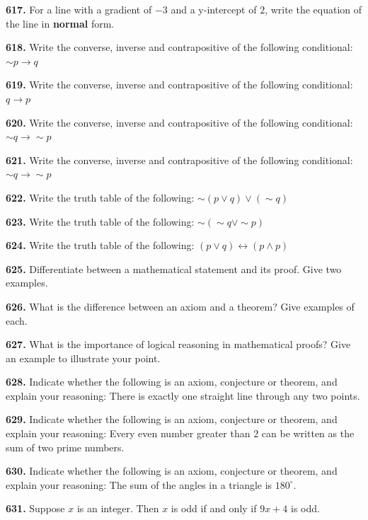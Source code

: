 \documentclass[11pt]{article}
\begin{document}
\bigskip
\noindent\textbf{617.} For a line with a gradient of $-3$ and a y-intercept of $2$, write the equation of the line in \textbf{normal} form.

\bigskip
\noindent\textbf{618.} Write the converse, inverse and contrapositive of the following conditional: $\sim p \rightarrow q$

\bigskip
\noindent\textbf{619.} Write the converse, inverse and contrapositive of the following conditional: $q \rightarrow p$

\bigskip
\noindent\textbf{620.} Write the converse, inverse and contrapositive of the following conditional: $\sim q \rightarrow \sim p$

\bigskip
\noindent\textbf{621.} Write the converse, inverse and contrapositive of the following conditional: $\sim q \rightarrow \sim p$

\bigskip
\noindent\textbf{622.} Write the truth table of the following: $\sim(p\vee q)\vee(\sim q)$

\bigskip
\noindent\textbf{623.} Write the truth table of the following: $\sim(\sim q \vee \sim p)$

\bigskip
\noindent\textbf{624.} Write the truth table of the following: $(p\vee q) \leftrightarrow (p \wedge p)$

\bigskip
\noindent\textbf{625.} Differentiate between a mathematical statement and its proof. Give two examples.

\bigskip
\noindent\textbf{626.} What is the difference between an axiom and a theorem? Give examples of each.

\bigskip
\noindent\textbf{627.} What is the importance of logical reasoning in mathematical proofs? Give an example to illustrate your point.

\bigskip
\noindent\textbf{628.} Indicate whether the following is an axiom, conjecture or theorem, and explain your reasoning: There is exactly one straight line through any two points.

\bigskip
\noindent\textbf{629.} Indicate whether the following is an axiom, conjecture or theorem, and explain your reasoning: Every even number greater than 2 can be written as the sum of two prime numbers.

\bigskip
\noindent\textbf{630.} Indicate whether the following is an axiom, conjecture or theorem, and explain your reasoning: The sum of the angles in a triangle is $180^{\circ}$.

\bigskip
\noindent\textbf{631.} Suppose $x$ is an integer. Then $x$ is odd if and only if $9x+4$ is odd.
\end{document}
